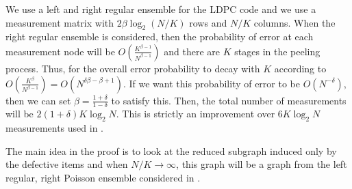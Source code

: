 \documentclass[conference,onecolumn]{IEEEtran}
\begin{document}
We use a left and right regular ensemble for the LDPC code and we use a measurement matrix with $2 \beta \log_2(N/K)$ rows and $N/K$ columns. When the right regular ensemble is considered, then the probability of error at each measurement node will be $O\left(\frac{K^{\beta-1}}{N^{\beta-1}}\right)$ and there are $K$ stages in the peeling process. Thus, for the overall error probability to decay with $K$ according to $O\left(\frac{K^{\beta}}{N^{\beta-1}}\right) = O\left(N^{\delta \beta - \beta + 1}\right)$. If we want this probability of error to be $O(N^{-\delta})$, then we can set $\beta = \frac{1+\delta}{1-\delta}$ to satisfy this. Then, the total number of measurements will be $2 (1+\delta) K \log_2 N$. This is strictly an improvement over $6 K \log_2 N$ measurements used in \cite{lee2015saffron}.

The main idea in the proof is to look at the reduced subgraph induced only by the defective items and when $N/K \rightarrow \infty$, this graph will be a graph from the left regular, right Poisson ensemble considered in \cite{lee2015saffron}.


\end{document}
